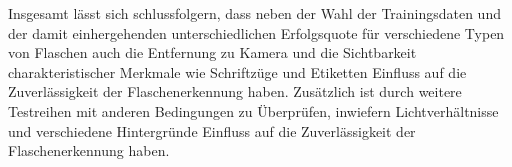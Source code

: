 \bigskip

Insgesamt lässt sich schlussfolgern, dass neben der Wahl der Trainingsdaten und der damit einhergehenden unterschiedlichen Erfolgsquote für verschiedene Typen von
Flaschen auch die Entfernung zu Kamera und die Sichtbarkeit charakteristischer Merkmale wie Schriftzüge und Etiketten Einfluss auf die Zuverlässigkeit der Flaschenerkennung haben.
Zusätzlich ist durch weitere Testreihen mit anderen Bedingungen zu Überprüfen,
inwiefern Lichtverhältnisse und verschiedene Hintergründe Einfluss auf die Zuverlässigkeit der Flaschenerkennung haben.